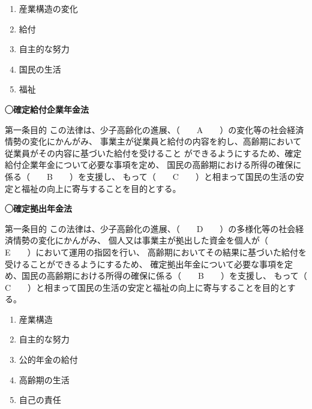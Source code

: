 \begin{answerbox}
 \begin{enumerate}[A:]
    \item 産業構造の変化
    \item 給付
    \item 自主的な努力
    \item 国民の生活
    \item 福祉
  \end{enumerate}
\end{answerbox}

\begin{fillblank}[年金1 \ H27 \ 問題1(2)]

  
  \noindent \textbf{◯確定給付企業年金法}
  \begin{lawstructure}
    \begin{lawarticle}{第一条}{目的}
      この法律は、少子高齢化の進展、（　　A　　）の変化等の社会経済情勢の変化にかんがみ、
      事業主が従業員と給付の内容を約し、高齢期において従業員がその内容に基づいた給付を受けること
      ができるようにするため、確定給付企業年金について必要な事項を定め、
      国民の高齢期における所得の確保に係る（　　B　　）を支援し、
      もって（　　C　　）と相まって国民の生活の安定と福祉の向上に寄与することを目的とする。
    \end{lawarticle}
  \end{lawstructure}

      
  \noindent \textbf{◯確定拠出年金法}
  \begin{lawstructure}
    \begin{lawarticle}{第一条}{目的}
      この法律は、少子高齢化の進展、（　　D　　）の多様化等の社会経済情勢の変化にかんがみ、
      個人又は事業主が拠出した資金を個人が（　　E　　）において運用の指図を行い、
      高齢期においてその結果に基づいた給付を受けることができるようにするため、
      確定拠出年金について必要な事項を定め、国民の高齢期における所得の確保に係る（　　B　　）を支援し、
      もって（　　C　　）と相まって国民の生活の安定と福祉の向上に寄与することを目的とする。
    \end{lawarticle}
  \end{lawstructure}

\end{fillblank}

\begin{answerbox}
 \begin{enumerate}[A:]
    \item 産業構造
    \item 自主的な努力
    \item 公的年金の給付
    \item 高齢期の生活
    \item 自己の責任
  \end{enumerate}
\end{answerbox}

